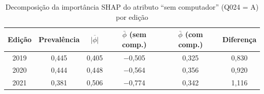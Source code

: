 \begin{table}[htbp]
\centering
\caption{Decomposição da importância SHAP do atributo ``sem computador'' (Q024 = A) por edição}
\label{tab:shap_q024}
\begin{tabular}{cccccc}
\toprule
\textbf{Edição} & \textbf{Prevalência} & $\overline{|\phi|}$ & $\bar{\phi}$ \textbf{(sem comp.)} & $\bar{\phi}$ \textbf{(com comp.)} & \textbf{Diferença} \\
\midrule
2019 & 0,445 & 0,405 & −0,505 & 0,325 & 0,830 \\
2020 & 0,444 & 0,448 & −0,564 & 0,356 & 0,920 \\
2021 & 0,381 & 0,506 & −0,774 & 0,342 & 1,116 \\
\bottomrule
\end{tabular}
\end{table}

